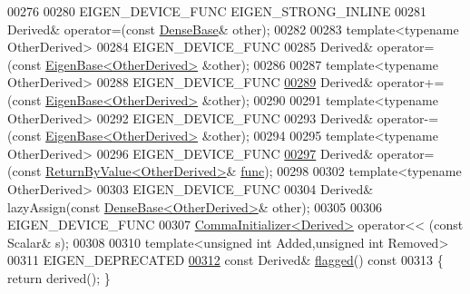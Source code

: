 \begin{DoxyCode}
00276 
00280     EIGEN\_DEVICE\_FUNC EIGEN\_STRONG\_INLINE
00281     Derived& operator=(\textcolor{keyword}{const} \hyperlink{group___core___module_class_eigen_1_1_dense_base}{DenseBase}& other);
00282 
00283     \textcolor{keyword}{template}<\textcolor{keyword}{typename} OtherDerived>
00284     EIGEN\_DEVICE\_FUNC
00285     Derived& operator=(\textcolor{keyword}{const} \hyperlink{group___core___module_struct_eigen_1_1_eigen_base}{EigenBase<OtherDerived>} &other);
00286 
00287     \textcolor{keyword}{template}<\textcolor{keyword}{typename} OtherDerived>
00288     EIGEN\_DEVICE\_FUNC
\hyperlink{group___core___module_a0ec93fbbf57f19fd6253fe1bef9a960c}{00289}     Derived& operator+=(\textcolor{keyword}{const} \hyperlink{group___core___module_struct_eigen_1_1_eigen_base}{EigenBase<OtherDerived>} &other);
00290 
00291     \textcolor{keyword}{template}<\textcolor{keyword}{typename} OtherDerived>
00292     EIGEN\_DEVICE\_FUNC
00293     Derived& operator-=(\textcolor{keyword}{const} \hyperlink{group___core___module_struct_eigen_1_1_eigen_base}{EigenBase<OtherDerived>} &other);
00294 
00295     \textcolor{keyword}{template}<\textcolor{keyword}{typename} OtherDerived>
00296     EIGEN\_DEVICE\_FUNC
\hyperlink{group___core___module_a17870bf03c6c431415882b214c244d0a}{00297}     Derived& operator=(\textcolor{keyword}{const} \hyperlink{group___core___module_class_eigen_1_1_return_by_value}{ReturnByValue<OtherDerived>}& 
      \hyperlink{structfunc}{func});
00298 
00302     \textcolor{keyword}{template}<\textcolor{keyword}{typename} OtherDerived>
00303     EIGEN\_DEVICE\_FUNC
00304     Derived& lazyAssign(\textcolor{keyword}{const} \hyperlink{group___core___module_class_eigen_1_1_dense_base}{DenseBase<OtherDerived>}& other);
00305 
00306     EIGEN\_DEVICE\_FUNC
00307     \hyperlink{group___core___module_struct_eigen_1_1_comma_initializer}{CommaInitializer<Derived>} operator<< (\textcolor{keyword}{const} Scalar& s);
00308 
00310     \textcolor{keyword}{template}<\textcolor{keywordtype}{unsigned} \textcolor{keywordtype}{int} Added,\textcolor{keywordtype}{unsigned} \textcolor{keywordtype}{int} Removed>
00311     EIGEN\_DEPRECATED
\hyperlink{group___core___module_a9b3f75f76ae40439be870258e80c7346}{00312}     \textcolor{keyword}{const} Derived& \hyperlink{group___core___module_a9b3f75f76ae40439be870258e80c7346}{flagged}()\textcolor{keyword}{ const}
00313 \textcolor{keyword}{    }\{ \textcolor{keywordflow}{return} derived(); \}

\end{DoxyCode}
